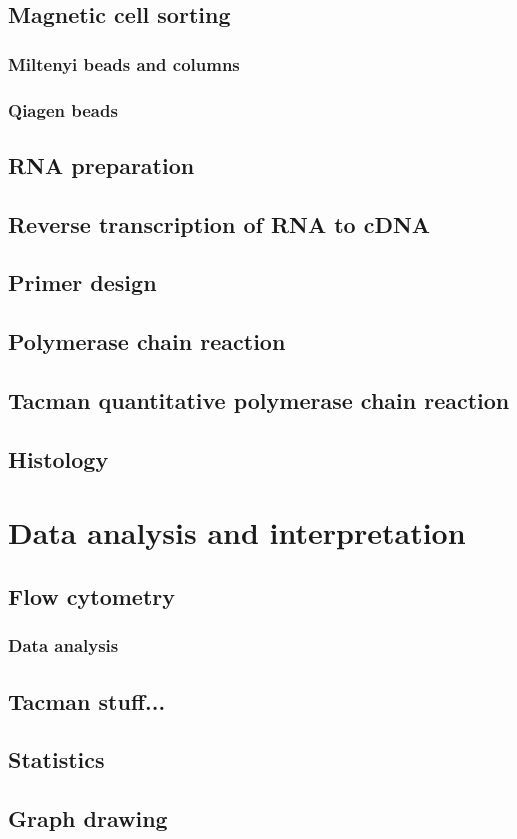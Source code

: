 \subsection{Magnetic cell sorting}

\subsubsection{Miltenyi beads and columns}

\subsubsection{Qiagen beads}

\subsection{RNA preparation}

\subsection{Reverse transcription of RNA to cDNA}

\subsection{Primer design}

\subsection{Polymerase chain reaction}

\subsection{Tacman quantitative polymerase chain reaction}

\subsection{Histology}

\section{Data analysis and interpretation}

\subsection{Flow cytometry}

\subsubsection{Data analysis}

\subsection{Tacman stuff...}

\subsection{Statistics}

\subsection{Graph drawing}


